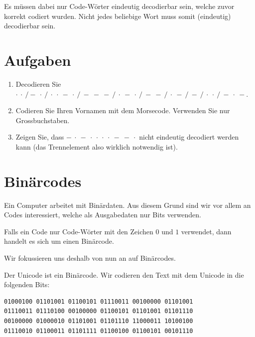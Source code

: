 Es müssen dabei nur Code-Wörter eindeutig decodierbar sein, welche zuvor korrekt codiert wurden. Nicht jedes beliebige Wort muss somit (eindeutig) decodierbar sein.

\section{Aufgaben}

\begin{enumerate}
\item Decodieren Sie $\cdot~\cdot~/-~\cdot~/~\cdot~\cdot~-~\cdot~/~-~-~-~/~\cdot~-~\cdot~/~-~-~/~\cdot~-~/~-~/~\cdot~\cdot~/~-~\cdot~-$.
\fillwithgrid{0.25in}
\item Codieren Sie Ihren Vornamen mit dem Morsecode. Verwenden Sie nur Grossbuchstaben.
\fillwithgrid{1in}
\item Zeigen Sie, dass $-~\cdot~-~\cdot~\cdot~\cdot~\cdot~-~-~\cdot$ nicht eindeutig decodiert werden kann (das Trennelement also wirklich notwendig ist).
\fillwithgrid{1in}
\end{enumerate}

\section{Binärcodes}

Ein Computer arbeitet mit Binärdaten. Aus diesem Grund sind wir vor allem an Codes interessiert, welche als Ausgabedaten nur Bits verwenden.

\begin{definition}[Binärcode]
Falls ein Code nur Code-Wörter mit den Zeichen $0$ und $1$ verwendet, dann handelt es sich um einen Binärcode.
\end{definition}

Wir fokussieren uns deshalb von nun an auf Binärcodes.

\begin{example}
Der Unicode ist ein Binärcode. Wir codieren den Text  mit dem Unicode in die folgenden Bits:

\begin{lstlisting}[language=output, caption={Leerzeichen und neue Zeilen dienen nur der Übersicht.}]
01000100 01101001 01100101 01110011 00100000 01101001
01110011 01110100 00100000 01100101 01101001 01101110
00100000 01000010 01101001 01101110 11000011 10100100
01110010 01100011 01101111 01100100 01100101 00101110
\end{lstlisting}

\end{example}